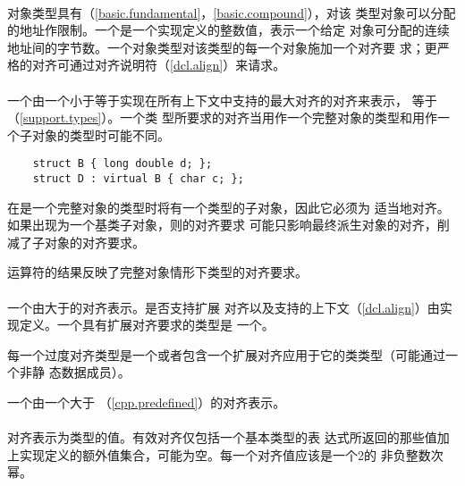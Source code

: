 \paragraph{} %
对象类型具有（\ref{basic.fundamental}，\ref{basic.compound}），对该
类型对象可以分配的地址作限制。一个是一个实现定义的整数值，表示一个给定
对象可分配的连续地址间的字节数。一个对象类型对该类型的每一个对象施加一个对齐要
求；更严格的对齐可通过对齐说明符（\ref{dcl.align}）来请求。

\paragraph{} %
一个由一个小于等于实现在所有上下文中支持的最大对齐的对齐来表示，
等于（\ref{support.types}）。一个类
型所要求的对齐当用作一个完整对象的类型和用作一个子对象的类型时可能不同。

\begin{example}
  \begin{lstlisting}
    struct B { long double d; };
    struct D : virtual B { char c; };
  \end{lstlisting}
  在是一个完整对象的类型时将有一个类型的子对象，因此它必须为
  适当地对齐。如果出现为一个基类子对象，则的对齐要求
  可能只影响最终派生对象的对齐，削减了子对象的对齐要求。
\end{example}

运算符的结果反映了完整对象情形下类型的对齐要求。

\paragraph{} %
一个由大于的对齐表示。是否支持扩展
对齐以及支持的上下文（\ref{dcl.align}）由实现定义。一个具有扩展对齐要求的类型是
一个。

\begin{note}
  每一个过度对齐类型是一个或者包含一个扩展对齐应用于它的类类型（可能通过一个非静
  态数据成员）。
\end{note}

一个由一个大于
（\ref{cpp.predefined}）的对齐表示。

\paragraph{} %
对齐表示为类型的值。有效对齐仅包括一个基本类型的表
达式所返回的那些值加上实现定义的额外值集合，可能为空。每一个对齐值应该是一个2的
非负整数次幂。

